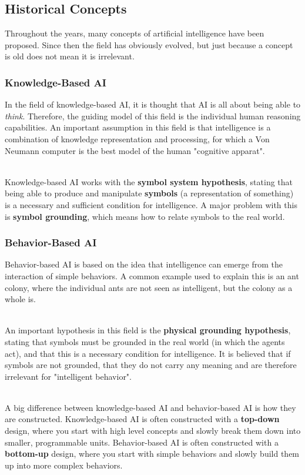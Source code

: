 \documentclass[12pt]{article}
\begin{document}
\subsection{Historical Concepts}
Throughout the years, many concepts of artificial intelligence have been proposed.
Since then the field has obviously evolved, but just because a concept is old does not mean it is irrelevant.

\subsubsection{Knowledge-Based AI}
In the field of knowledge-based AI, it is thought that AI is all about being able to \textit{think}.
Therefore, the guiding model of this field is the individual human reasoning capabilities.
An important assumption in this field is that intelligence is a combination of knowledge representation and processing, for which a Von Neumann computer is the best model of the human "cognitive apparat".

\noindent
\\
Knowledge-based AI works with the \textbf{symbol system hypothesis}, stating that being able to produce and manipulate \textbf{symbols} (a representation of something) is a necessary and sufficient condition for intelligence.
A major problem with this is \textbf{symbol grounding}, which means how to relate symbols to the real world.

\newpage
\subsubsection{Behavior-Based AI}
Behavior-based AI is based on the idea that intelligence can emerge from the interaction of simple behaviors.
A common example used to explain this is an ant colony, where the individual ants are not seen as intelligent, but the colony as a whole is.

\noindent
\\
An important hypothesis in this field is the \textbf{physical grounding hypothesis}, stating that symbols must be grounded in the real world (in which the agents act), and that this is a necessary condition for intelligence.
It is believed that if symbols are not grounded, that they do not carry any meaning and are therefore irrelevant for "intelligent behavior".

\noindent
\\
A big difference between knowledge-based AI and behavior-based AI is how they are constructed.
Knowledge-based AI is often constructed with a \textbf{top-down} design, where you start with high level concepts and slowly break them down into smaller, programmable units.
Behavior-based AI is often constructed with a \textbf{bottom-up} design, where you start with simple behaviors and slowly build them up into more complex behaviors.
\end{document}
